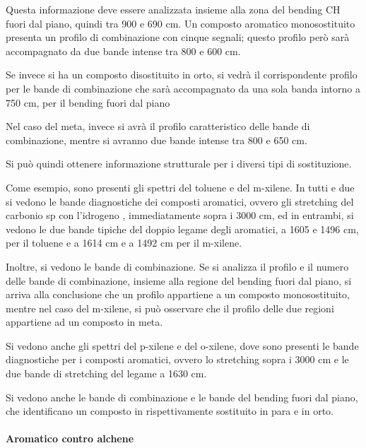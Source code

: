 Questa informazione deve essere analizzata insieme alla zona del bending
CH fuori dal piano, quindi tra 900 e 690 cm. Un composto aromatico
monosostituito presenta un profilo di combinazione con cinque segnali;
questo profilo però sarà accompagnato da due bande intense tra 800 e 600
cm.

Se invece si ha un composto disostituito in orto, si vedrà il
corrispondente profilo per le bande di combinazione che sarà
accompagnato da una sola banda intorno a 750 cm, per il bending fuori
dal piano

Nel caso del meta, invece si avrà il profilo caratteristico delle bande
di combinazione, mentre si avranno due bande intense tra 800 e 650 cm.

Si può quindi ottenere informazione strutturale per i diversi tipi di
sostituzione.


Come esempio, sono presenti gli spettri del toluene e del m-xilene. In
tutti e due si vedono le bande diagnostiche dei composti aromatici,
ovvero gli stretching del carbonio sp con l'idrogeno ,
immediatamente sopra i 3000 cm, ed in entrambi, si vedono le due bande
tipiche del doppio legame  degli aromatici, a 1605 e 1496 cm, per
il toluene e a 1614 cm e a 1492 cm per il m-xilene.

Inoltre, si vedono le bande di combinazione. Se si analizza il profilo e
il numero delle bande di combinazione, insieme alla regione del bending
fuori dal piano, si arriva alla conclusione che un profilo appartiene a
un composto monosostituito, mentre nel caso del m-xilene, si può
osservare che il profilo delle due regioni appartiene ad un composto in
meta.


Si vedono anche gli spettri del p-xilene e del o-xilene, dove sono
presenti le bande diagnostiche per i composti aromatici, ovvero lo
stretching  sopra i 3000 cm e le due bande di stretching del legame
 a 1630 cm.

Si vedono anche le bande di combinazione e le bande del bending fuori
dal piano, che identificano un composto in rispettivamente sostituito in
para e in orto.

\paragraph*{Aromatico contro alchene}

